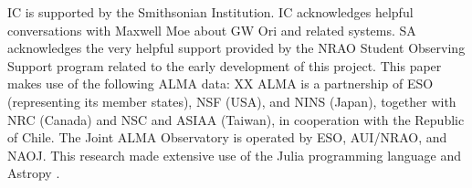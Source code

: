 \documentclass{aastex6}
\begin{document}
\acknowledgments
IC is supported by the Smithsonian Institution. IC acknowledges helpful conversations with Maxwell Moe about GW Ori and related systems.  SA acknowledges the very helpful support provided by the NRAO Student Observing Support program related to the early development of this project.  This paper makes use of the following ALMA data: XX  ALMA is a partnership of ESO (representing its member states), NSF (USA), and NINS (Japan), together with NRC (Canada) and NSC and ASIAA (Taiwan), in cooperation with the Republic of Chile.  The Joint ALMA Observatory is operated by ESO, AUI/NRAO, and NAOJ.  This research made extensive use of the Julia programming language \citep{julia12} and Astropy \citep{astropy13}.



\end{document}
